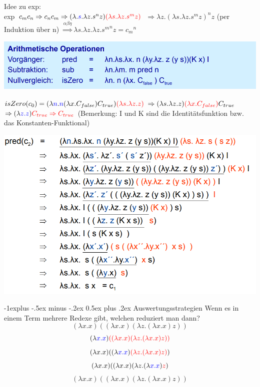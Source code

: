 \documentclass[10pt]{article}
\makeatletter
\renewcommand{\subsection}{\@startsection{subsection}{2}{0mm}%
                                {-1explus -.5ex minus -.2ex}%
                                {0.5ex plus .2ex}%
                                {\normalfont\normalsize\bfseries}}
\makeatother
\begin{document}
  Idee zu exp: \\
  \subitem exp $c_m c_n \Rightarrow c_n c_m \Rightarrow (\lambda.\color{blue}s\color{black}.\lambda z.s^n z)\color{red}(\lambda s. \lambda z.s^m z)$ \color{black}
  \subsubitem $\Rightarrow \lambda z.(\lambda s. \lambda z.s^m z)^n z$
  \subitem (per Induktion über n) $\stackrel{\alpha \beta \eta}{\Rightarrow}\lambda s.\lambda z. \lambda z.{s^m}^n z = {c_m}^n$

  \begin{center}
    \includegraphics[width=0.4\linewidth]{Assets/Programmierparadigmen-Arithmetische-Operationen}
  \end{center}
  
  \subitem $isZero(c_0) = (\lambda\color{blue}n\color{black}.\color{blue}n\color{black}(\lambda x.C_{false})C_{true})\color{red} (\lambda s.\lambda z.z)\color{black}$
  \subsubitem $\Rightarrow (\lambda s. \lambda z. z)\color{red} (\lambda x.C_{false})\color{black} C_{true}$
  \subsubitem $\Rightarrow (\lambda \color{blue} z.z \color{black}) \color{red} C_{true} \Rightarrow C_{true}$
  (Bemerkung: I und K sind die Identitätsfunktion bzw. das Konstanten-Funktional)
  
  \begin{center}
    \includegraphics[width=0.4\linewidth]{Assets/Programmierparadigmen-Arithmetische-Operationen-2}
  \end{center}
  
  \subsection{Auswertungsstrategien}
  Wenn es in einem Term mehrere Redexe gibt, welchen reduziert man dann?
  $$(\lambda x.x)((\lambda x.x)(\lambda z.(\lambda x.x)z))$$
  $$(\lambda \color{blue}x.x\color{black})\color{red}((\lambda x.x)(\lambda z.(\lambda x.x)z)) \color{black}$$
  $$(\lambda x.x)((\lambda \color{blue}x.x\color{black})\color{red}(\lambda z.(\lambda x.x)z)\color{black})$$
  $$(\lambda x.x)((\lambda x.x)(\lambda z.(\lambda \color{blue}x.x\color{black})\color{red}z\color{black})$$
  $$(\lambda x.x)((\lambda x.x)(\lambda z.(\lambda x.x)z))$$
  
\end{document}
